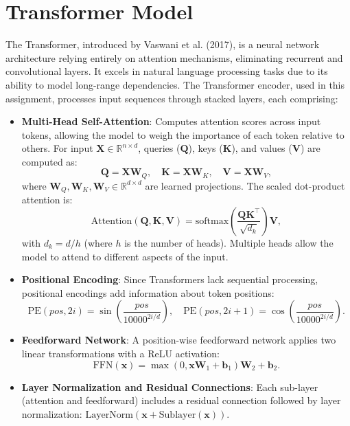 \documentclass{article}
\begin{document}
\section{Transformer Model}
The Transformer, introduced by Vaswani et al. (2017), is a neural network architecture relying entirely on attention mechanisms, eliminating recurrent and convolutional layers. It excels in natural language processing tasks due to its ability to model long-range dependencies. The Transformer encoder, used in this assignment, processes input sequences through stacked layers, each comprising:

\begin{itemize}
    \item \textbf{Multi-Head Self-Attention}: Computes attention scores across input tokens, allowing the model to weigh the importance of each token relative to others. For input \( \mathbf{X} \in \mathbb{R}^{n \times d} \), queries (\( \mathbf{Q} \)), keys (\( \mathbf{K} \)), and values (\( \mathbf{V} \)) are computed as:
    \[
    \mathbf{Q} = \mathbf{XW}_Q, \quad \mathbf{K} = \mathbf{XW}_K, \quad \mathbf{V} = \mathbf{XW}_V,
    \]
    where \( \mathbf{W}_Q, \mathbf{W}_K, \mathbf{W}_V \in \mathbb{R}^{d \times d} \) are learned projections. The scaled dot-product attention is:
    \[
    \text{Attention}(\mathbf{Q}, \mathbf{K}, \mathbf{V}) = \text{softmax}\left(\frac{\mathbf{Q}\mathbf{K}^\top}{\sqrt{d_k}}\right)\mathbf{V},
    \]
    with \( d_k = d/h \) (where \( h \) is the number of heads). Multiple heads allow the model to attend to different aspects of the input.
    \item \textbf{Positional Encoding}: Since Transformers lack sequential processing, positional encodings add information about token positions:
    \[
    \text{PE}(pos, 2i) = \sin\left(\frac{pos}{10000^{2i/d}}\right), \quad \text{PE}(pos, 2i+1) = \cos\left(\frac{pos}{10000^{2i/d}}\right).
    \]
    \item \textbf{Feedforward Network}: A position-wise feedforward network applies two linear transformations with a ReLU activation:
    \[
    \text{FFN}(\mathbf{x}) = \max(0, \mathbf{xW}_1 + \mathbf{b}_1)\mathbf{W}_2 + \mathbf{b}_2.
    \]
    \item \textbf{Layer Normalization and Residual Connections}: Each sub-layer (attention and feedforward) includes a residual connection followed by layer normalization: \( \text{LayerNorm}(\mathbf{x} + \text{Sublayer}(\mathbf{x})) \).
\end{itemize}
\end{document}
